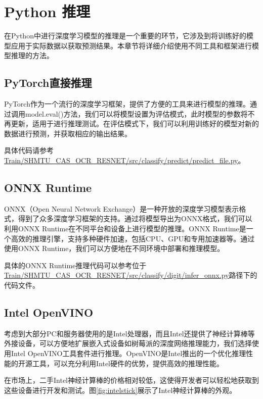 \chapter{Python 推理}
\label{chapter:7}

在Python中进行深度学习模型的推理是一个重要的环节，它涉及到将训练好的模型应用于实际数据以获取预测结果。本章节将详细介绍使用不同工具和框架进行模型推理的方法。

\section{PyTorch直接推理}

PyTorch作为一个流行的深度学习框架，提供了方便的工具来进行模型的推理。通过调用model.eval()方法，我们可以将模型设置为评估模式，此时模型的参数将不再更新，适用于进行推理测试。在评估模式下，我们可以利用训练好的模型对新的数据进行预测，并获取相应的输出结果。

具体代码请参考\url{Train/SHMTU_CAS_OCR_RESNET/src/classify/predict/predict_file.py}。

\section{ONNX Runtime}

ONNX（Open Neural Network Exchange）是一种开放的深度学习模型表示格式，得到了众多深度学习框架的支持。通过将模型导出为ONNX格式，我们可以利用ONNX Runtime在不同平台和设备上进行模型的推理。ONNX Runtime是一个高效的推理引擎，支持多种硬件加速，包括CPU、GPU和专用加速器等。通过使用ONNX Runtime，我们可以方便地在不同环境中部署和推理模型。

具体的ONNX Runtime推理代码可以参考位于\url{Train/SHMTU_CAS_OCR_RESNET/src/classify/digit/infer_onnx.py}路径下的代码文件。

\section{Intel OpenVINO}

考虑到大部分PC和服务器使用的是Intel处理器，而且Intel还提供了神经计算棒等外接设备，可以方便地扩展嵌入式设备如树莓派的深度网络推理能力，我们选择使用Intel OpenVINO工具套件进行推理。OpenVINO是Intel推出的一个优化推理性能的开源工具，可以充分利用Intel硬件的优势，提供高效的推理性能。

在市场上，二手Intel神经计算棒的价格相对较低，这使得开发者可以轻松地获取到这些设备进行开发和测试。图\ref{fig:intelstick}展示了Intel神经计算棒的外观。

